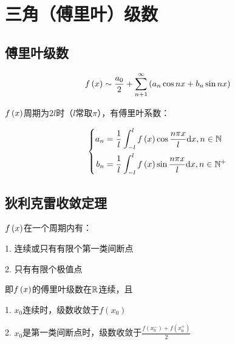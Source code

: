 \documentclass{article}
\begin{document}
\section{三角（傅里叶）级数}

\subsection{傅里叶级数}

\[f\left(x\right)\sim
    \frac{a_0}2+\sum_{n+1}^\infty\left(a_n\cos nx+b_n\sin nx\right)\]

$f\left(x\right)$周期为$2l$时（$l$常取$\pi$），有傅里叶系数：

\[\left\{\begin{aligned}
        a_n & =\frac1l\int_{-l}^lf\left(x\right)\cos\frac{n\pi x}l\mathrm d x,n\in\mathbb N  \\
        b_n & =\frac1l\int_{-l}^lf\left(x\right)\sin\frac{n\pi x}l\mathrm d x,n\in\mathbb N^+
    \end{aligned}\right.\]

\subsection{狄利克雷收敛定理}

$f\left(x\right)$在一个周期内有：

1. 连续或只有有限个第一类间断点

2. 只有有限个极值点

即$f\left(x\right)$的傅里叶级数在$\mathbb R$连续，且

1. $x_0$连续时，级数收敛于$f(x_0)$

2. $x_0$是第一类间断点时，级数收敛于$\frac{f(x_0^-)+f(x_0^+)}2$
\end{document}
